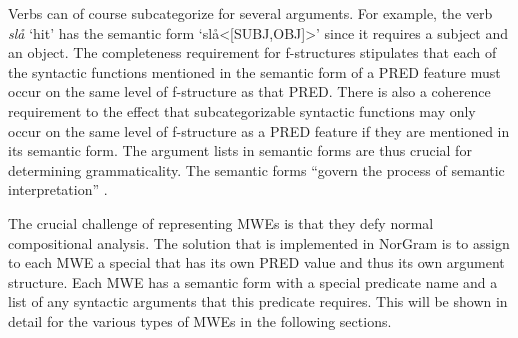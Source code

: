 \documentclass[output=paper]{langsci/langscibook}
\begin{document}
Verbs can of course subcategorize for several arguments.
For example, the verb \textit{slå} `hit' has the semantic form `slå<[SUBJ,OBJ]>' since it requires a subject and an object.
The completeness requirement for f-structures stipulates that each of the syntactic functions mentioned in the semantic form of a PRED feature must occur on the same level of f-structure as that PRED.
There is also a coherence requirement to the effect that subcategorizable syntactic functions may only occur on the same level of f-structure as a PRED feature if they are mentioned in its semantic form.
The argument lists in semantic forms are thus crucial for determining grammaticality.
The semantic forms ``govern the process of semantic interpretation” \citep[177]{kaplanbresnan82}.

The crucial challenge of representing MWEs is that they defy normal compositional analysis.
The  solution that is implemented in NorGram is to assign to each MWE a special  that has its own PRED value and thus its own argument structure.
Each MWE has a semantic form with a special predicate name and a list of any syntactic arguments that this predicate requires.
This will be shown in detail for the various types of MWEs in the following sections.

%
%


\end{document}
